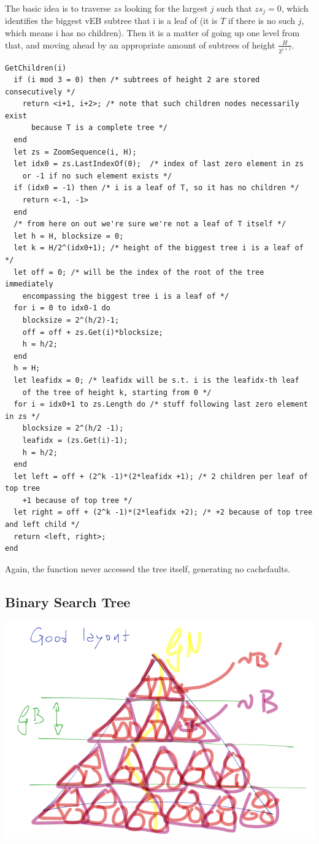 \documentclass[a4paper]{article}
\begin{document}
The basic idea is to traverse $zs$ looking for the largest $j$ such that $zs_j = 0$, which identifies the biggest vEB subtree that i is a leaf of (it is $T$ if there is no such $j$, which means i has no children). Then it is a matter of going up one level from that, and moving ahead by an appropriate amount of subtrees of height $\frac{H}{2^{j+1}}$.
\begin{verbatim}
GetChildren(i)
  if (i mod 3 = 0) then /* subtrees of height 2 are stored consecutively */
    return <i+1, i+2>; /* note that such children nodes necessarily exist
      because T is a complete tree */
  end
  let zs = ZoomSequence(i, H);
  let idx0 = zs.LastIndexOf(0);  /* index of last zero element in zs
    or -1 if no such element exists */
  if (idx0 = -1) then /* i is a leaf of T, so it has no children */
    return <-1, -1>
  end
  /* from here on out we're sure we're not a leaf of T itself */
  let h = H, blocksize = 0;
  let k = H/2^(idx0+1); /* height of the biggest tree i is a leaf of */
  let off = 0; /* will be the index of the root of the tree immediately
    encompassing the biggest tree i is a leaf of */
  for i = 0 to idx0-1 do
    blocksize = 2^(h/2)-1;
    off = off + zs.Get(i)*blocksize;
    h = h/2;
  end
  h = H;
  let leafidx = 0; /* leafidx will be s.t. i is the leafidx-th leaf
    of the tree of height k, starting from 0 */
  for i = idx0+1 to zs.Length do /* stuff following last zero element in zs */
    blocksize = 2^(h/2 -1);
    leafidx = (zs.Get(i)-1);
    h = h/2;
  end
  let left = off + (2^k -1)*(2*leafidx +1); /* 2 children per leaf of top tree
    +1 because of top tree */
  let right = off + (2^k -1)*(2*leafidx +2); /* +2 because of top tree and left child */
  return <left, right>;
end
\end{verbatim}
Again, the function never accessed the tree itself, generating no cachefaults.

\subsection*{Binary Search Tree}
\includegraphics[scale = 0.65]{pic}
\end{document}
